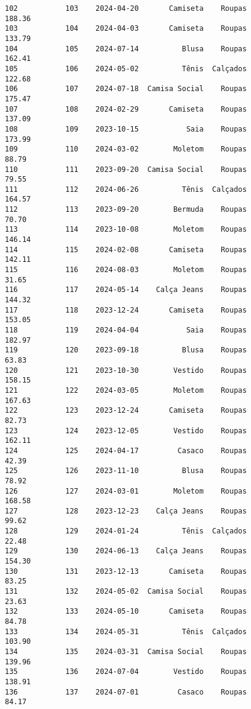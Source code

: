 \documentclass[11pt]{article}
\begin{document}
\begin{Verbatim}[commandchars=\\\{\}]
102           103    2024-04-20       Camiseta    Roupas          188.36   
103           104    2024-04-03       Camiseta    Roupas          133.79   
104           105    2024-07-14          Blusa    Roupas          162.41   
105           106    2024-05-02          Tênis  Calçados          122.68   
106           107    2024-07-18  Camisa Social    Roupas          175.47   
107           108    2024-02-29       Camiseta    Roupas          137.09   
108           109    2023-10-15           Saia    Roupas          173.99   
109           110    2024-03-02        Moletom    Roupas           88.79   
110           111    2023-09-20  Camisa Social    Roupas           79.55   
111           112    2024-06-26          Tênis  Calçados          164.57   
112           113    2023-09-20        Bermuda    Roupas           70.70   
113           114    2023-10-08        Moletom    Roupas          146.14   
114           115    2024-02-08       Camiseta    Roupas          142.11   
115           116    2024-08-03        Moletom    Roupas           31.65   
116           117    2024-05-14    Calça Jeans    Roupas          144.32   
117           118    2023-12-24       Camiseta    Roupas          153.05   
118           119    2024-04-04           Saia    Roupas          182.97   
119           120    2023-09-18          Blusa    Roupas           63.83   
120           121    2023-10-30        Vestido    Roupas          158.15   
121           122    2024-03-05        Moletom    Roupas          167.63   
122           123    2023-12-24       Camiseta    Roupas           82.73   
123           124    2023-12-05        Vestido    Roupas          162.11   
124           125    2024-04-17         Casaco    Roupas           42.39   
125           126    2023-11-10          Blusa    Roupas           78.92   
126           127    2024-03-01        Moletom    Roupas          168.58   
127           128    2023-12-23    Calça Jeans    Roupas           99.62   
128           129    2024-01-24          Tênis  Calçados           22.48   
129           130    2024-06-13    Calça Jeans    Roupas          154.30   
130           131    2023-12-13       Camiseta    Roupas           83.25   
131           132    2024-05-02  Camisa Social    Roupas           23.63   
132           133    2024-05-10       Camiseta    Roupas           84.78   
133           134    2024-05-31          Tênis  Calçados          103.90   
134           135    2024-03-31  Camisa Social    Roupas          139.96   
135           136    2024-07-04        Vestido    Roupas          138.91   
136           137    2024-07-01         Casaco    Roupas           84.17   

\end{Verbatim}
\end{document}
